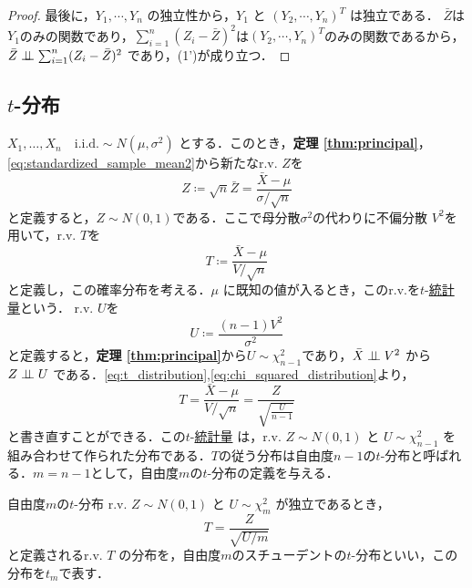 \documentclass[main.tex]{subfiles}
\begin{document}
\begin{proof}
最後に，$Y_1, \cdots, Y_n$ の独立性から，$Y_1$ と $(Y_2, \cdots, Y_n)^T $ は独立である．
$\bar{Z}$は$Y_1$のみの関数であり，$\sum_{i=1}^{n} (Z_i - \bar{Z})^2$は$(Y_2, \cdots, Y_n)^T$のみの関数であるから，
$\bar{Z} \perp\!\!\!\perp \sum_{i=1}^{n} (Z_i - \bar{Z})^2$ であり，(1')が成り立つ．
\end{proof}

\subsection{$t$-分布}
$X_1, \dots, X_n \quad \text{i.i.d.} \sim N(\mu, \sigma^2)$ とする．このとき，\textbf{定理 \ref{thm:principal}}，\eqref{eq:standardized_sample_mean2}から新たなr.v. $Z$を
\begin{equation}
  Z \coloneqq \sqrt{n} \bar{Z} = \frac{\bar{X}-\mu}{\sigma/\sqrt{n}}
\end{equation}
と定義すると，$Z \sim N(0,1)$である．ここで母分散$\sigma^2$の代わりに不偏分散 $V^2$を用いて，r.v. $T$を
\begin{equation}
  T \coloneqq \frac{\bar{X}-\mu}{V/\sqrt{n}}
  \label{eq:t_distribution}
\end{equation}
と定義し，この確率分布を考える．$\mu$ に既知の値が入るとき，このr.v.を$t$-\hyperlink{def:statistic}{統計量}という．
r.v. $U$を
\begin{equation}
  U \coloneqq \frac{(n-1)V^2}{\sigma^2} 
  \label{eq:chi_squared_distribution}
\end{equation}
と定義すると，\textbf{定理 \ref{thm:principal}}から$U \sim \chi^2_{n-1}$であり，$\bar{X} \perp\!\!\!\perp V^2$ から $Z \perp\!\!\!\perp U$ である．\eqref{eq:t_distribution},\quad \eqref{eq:chi_squared_distribution}より，
\begin{equation}
  T = \frac{\bar{X}-\mu}{V/\sqrt{n}} = \frac{Z}{\sqrt{\frac{U}{n-1}}}
\end{equation}
と書き直すことができる．この$t$-\hyperlink{def:statistic}{統計量} は，r.v. $Z \sim N(0,1)$ と $U \sim \chi^2_{n-1}$ を組み合わせて作られた分布である．$T$の従う分布は自由度$n-1$の$t$-分布と呼ばれる．$m=n-1$として，自由度$m$の$t$-分布の定義を与える．
\begin{mydefinition}{自由度$m$の$t$-分布}
r.v. $Z \sim N(0,1)$ と $U \sim \chi^2_{m}$ が独立であるとき，
\begin{equation}
  T = \frac{Z}{\sqrt{U/m}}
\end{equation}
と定義されるr.v. $T$ の分布を，自由度$m$のスチューデントの$t$-分布といい，この分布を$t_m$で表す．
\end{mydefinition}
\end{document}
